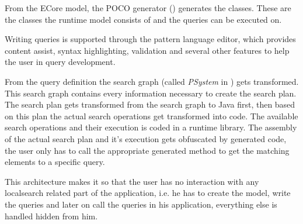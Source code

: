 From the ECore model, the POCO generator ()
generates the \CPP{} classes. These are the classes the runtime model consists
of and the queries can be executed on.

Writing queries is supported through the \EIQ{} pattern language editor, which
provides content assist, syntax highlighting, validation and several other
features to help the user in query development.

From the query definition the search graph (called \emph{PSystem} in
\EIQ{}) gets transformed. This search graph contains every information
necessary to create the search plan. The search plan gets transformed from the
search graph to Java first, then based on this plan the actual search operations
get transformed into \CPP{} code. The available search operations and their
execution is coded in a runtime library. The assembly of the actual search plan
and it's execution gets obfuscated by generated code, the user only has to call
the appropriate generated method to get the matching elements to a specific query.

This architecture makes it so that the user has no interaction with any
localsearch related part of the application, i.e. he has to create the model,
write the queries and later on call the queries in his \CPP{} application,
everything else is handled hidden from him.
